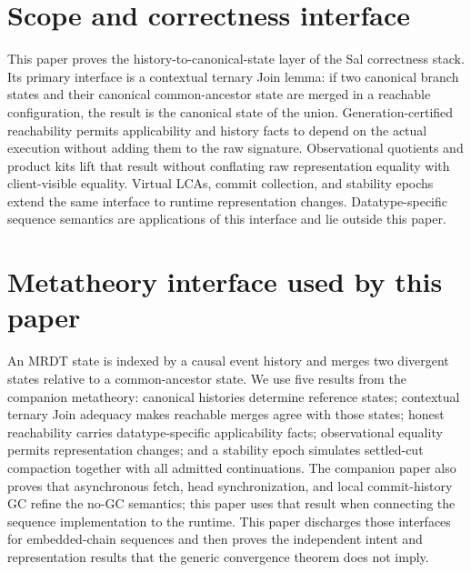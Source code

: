 \documentclass[11pt]{article}
\begin{document}
\ifdefined\salPaperA
\section*{Scope and correctness interface}
\label{sec:storage}
This paper proves the history-to-canonical-state layer of the Sal correctness
stack. Its primary interface is a contextual ternary Join lemma: if two
canonical branch states and their canonical common-ancestor state are merged
in a reachable configuration, the result is the canonical state of the union.
Generation-certified reachability permits applicability and history facts to
depend on the actual execution without adding them to the raw signature.
Observational quotients and product kits lift that result without conflating
raw representation equality with client-visible equality. Virtual LCAs,
commit collection, and stability epochs extend the same interface to runtime
representation changes. Datatype-specific sequence semantics are applications
of this interface and lie outside this paper.
\else\ifdefined\salPaperB
\section*{Metatheory interface used by this paper}
\label{def:delta}\label{def:honestreach}\label{fvc:cd}\label{fvc:lredist}
\label{sec:cvcs}\label{sec:gc}\label{sec:route}\label{sec:setting}
\label{sec:stability}\label{thm:evidence}\label{thm:gcsafety}
An MRDT state is indexed by a causal event history and merges two divergent
states relative to a common-ancestor state. We use five results from the
companion metatheory: canonical histories determine reference states;
contextual ternary Join adequacy makes reachable merges agree with those
states; honest reachability carries datatype-specific applicability facts;
observational equality permits representation changes; and a stability epoch
simulates settled-cut compaction together with all admitted continuations.
The companion paper also proves that asynchronous fetch, head synchronization,
and local commit-history GC refine the no-GC semantics; this paper uses that
result when connecting the sequence implementation to the runtime.
This paper discharges those interfaces for embedded-chain sequences and then
proves the independent intent and representation results that the generic
convergence theorem does not imply.
\else
\end{document}

